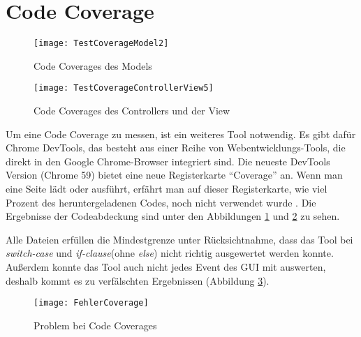 \section{Code Coverage}

\begin{figure}[ !h] \centering
\texttt{[image: TestCoverageModel2]}
\caption[Code Coverages des Models]{Code Coverages des Models}\label{fig:TestCoverageModel}
\end{figure}

\begin{figure}[ !h] \centering
\texttt{[image: TestCoverageControllerView5]}
\caption[Code Coverages des Controllers und der View]{Code Coverages des Controllers und der View}\label{fig:TestCoverageClientLogik}
\end{figure}

Um eine Code Coverage zu messen, ist ein weiteres Tool notwendig. Es gibt dafür Chrome DevTools, das besteht aus einer Reihe von Webentwicklungs-Tools, die direkt in den Google Chrome-Browser integriert sind. Die neueste DevTools Version (Chrome 59) bietet eine neue Registerkarte ``Coverage'' an. Wenn man eine Seite lädt oder ausführt, erfährt man auf dieser Registerkarte, wie viel Prozent des heruntergeladenen Codes, noch nicht verwendet wurde \cite{Kayce}.
Die Ergebnisse der Codeabdeckung sind unter den Abbildungen \ref{fig:TestCoverageModel} und \ref{fig:TestCoverageClientLogik} zu sehen.

Alle Dateien erfüllen die Mindestgrenze unter Rücksichtnahme, dass das Tool bei \textit{switch-case} und \textit{if-clause}(ohne \textit{else}) nicht richtig ausgewertet werden konnte. Außerdem konnte das Tool auch nicht jedes Event des GUI mit auswerten, deshalb kommt es zu verfälschten Ergebnissen (Abbildung \ref{fig:FehlerCoverage}).

\begin{figure}[ !h] \centering
\texttt{[image: FehlerCoverage]}
\caption[Problem bei CodeCoverages]{Problem bei Code Coverages}
\label{fig:FehlerCoverage}
\end{figure}